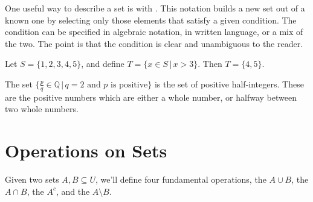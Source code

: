 One useful way to describe a set is with . This notation builds a new set out of a known one by selecting only those elements that satisfy a given condition. The condition can be specified in algebraic notation, in written language, or a mix of the two. The point is that the condition is clear and unambiguous to the reader.

\begin{example}
Let $S = \{1,2,3,4,5\}$, and define $T = \{x \in S \, | \, x > 3\}$. Then $T = \{4,5\}$.
\end{example}

\begin{example}
The set $\{\frac{p}{q} \in \mathbb{Q} \, | \, q=2 \text{ and $p$ is positive}\}$ is the set of positive half-integers. These are the positive numbers which are either a whole number, or halfway between two whole numbers.
\end{example}

\section{Operations on Sets}

Given two sets $A, B \subseteq U$, we'll define four fundamental operations, the  $A \cup B$, the  $A \cap B$, the  $A^c$, and the  $A \setminus B$.

